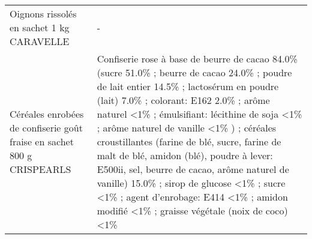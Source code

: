 \begin{longtable}{p{5cm}p{10cm}}
                                                                Oignons rissolés en sachet 1 kg CARAVELLE &                                                                                                                                                                                                                                                                                                                                                                                                                                                                                                                                                                                                                                                                                                                                                                                                                                                                                                                                                                                                                                        - \\
                                   Céréales enrobées de confiserie goût fraise en sachet 800 g CRISPEARLS &                                                                                                                                                                                                                                                                                                                                                                                                                                                                     Confiserie rose à base de beurre de cacao 84.0\% (sucre 51.0\% ; beurre de cacao 24.0\% ; poudre de lait entier 14.5\% ; lactosérum en poudre (lait) 7.0\% ; colorant: E162 2.0\% ; arôme naturel <1\% ; émulsifiant: lécithine de soja <1\% ; arôme naturel de vanille <1\% ) ; céréales croustillantes (farine de blé, sucre, farine de malt de blé, amidon (blé), poudre à lever: E500ii, sel, beurre de cacao, arôme naturel de vanille) 15.0\% ; sirop de glucose <1\% ; sucre <1\% ; agent d'enrobage: E414 <1\% ; amidon modifié <1\% ; graisse végétale (noix de coco) <1\% \\

\end{longtable}

